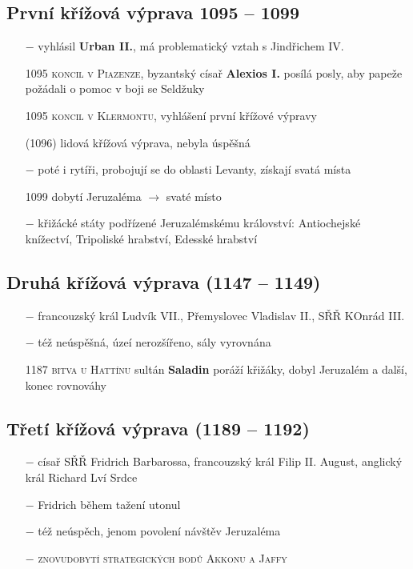 \documentclass{article}
\begin{document}
\subsection*{První křížová výprava 1095 -- 1099}
\begin{itemize}
    \vspace{-0.5em}
    \setlength\itemsep{0.15em}
    \item[$-$] vyhlásil \textbf{Urban II.}, má problematický vztah s Jindřichem IV.
    \item[1095] \textsc{koncil v Piazenze}, byzantský císař \textbf{Alexios I.} posílá posly, aby papeže požádali o pomoc v boji se Seldžuky
    \item[1095] \textsc{koncil v Klermontu}, vyhlášení první křížové výpravy
    \item[(1096)] lidová křížová výprava, nebyla úspěšná
    \item[$-$] poté i rytíři, probojují se do oblasti Levanty, získají svatá místa
    \item[1099] dobytí Jeruzaléma $\rightarrow$ svaté místo
    \item[$-$] křižácké státy podřízené Jeruzalémskému království: Antiochejské knížectví, Tripoliské hrabství, Edesské hrabství
\end{itemize}

\subsection*{Druhá křížová výprava (1147 -- 1149)}
\begin{itemize}
    \vspace{-0.5em}
    \setlength\itemsep{0.15em}
    \item[$-$] francouzský král Ludvík VII., Přemyslovec Vladislav II., SŘŘ KOnrád III.
    \item[$-$] též neúspěšná, úzeí nerozšířeno, sály vyrovnána
    \item[1187] \textsc{bitva u Hattínu} sultán \textbf{Saladin} poráží křižáky, dobyl Jeruzalém a další, konec rovnováhy
\end{itemize}


\subsection*{Třetí křížová výprava (1189 -- 1192)}
\begin{itemize}
    \vspace{-0.5em}
    \setlength\itemsep{0.15em}
    \item[$-$] císař SŘŘ Fridrich Barbarossa, francouzský král Filip II. August, anglický král Richard Lví Srdce
    \item[$-$] Fridrich během tažení utonul
    \item[$-$] též neúspěch, jenom povolení návštěv Jeruzaléma
    \item[$-$] \textsc{znovudobytí strategických bodů Akkonu a Jaffy}
\end{itemize}
\end{document}
